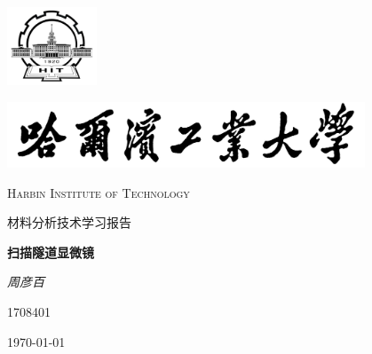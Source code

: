 \documentclass[a4paper, zihao=-4, linespread=1.25]{ctexrep}
\author{周彦百}
\begin{document}

\begin{titlepage}
	\centering
	\includegraphics[width=0.2\textwidth]{SchoolLogo}\par
	\vspace{1cm}
	\includegraphics[width=0.8\textwidth]{SchoolName}\par
	\vspace{0.1cm}
	{\scshape\LARGE Harbin Institute of Technology \par}
	\vspace{1cm}
	{\kaishu\LARGE 材料分析技术学习报告\par}
	\vspace{1.5cm}
	{\huge\bfseries 扫描隧道显微镜\par}
	\vspace{2cm}
	{\fangsong\Large\itshape 周彦百 \par}
	\vfill
	{1708401}\par

	\vfill
	{\large \today\par}
\end{titlepage}


\pagestyle{fancy}
	\lhead{}
	\rhead{}
	\lfoot{}
	\cfoot{\thepage\ }
	\rfoot{}
	
	

\tableofcontents

\pagebreak

\pagestyle{fancy}
\lhead{}
\rhead{}
\lfoot{}
\cfoot{- \thepage\ -}
\rfoot{}
\setcounter{page}{1} %
\end{document}
